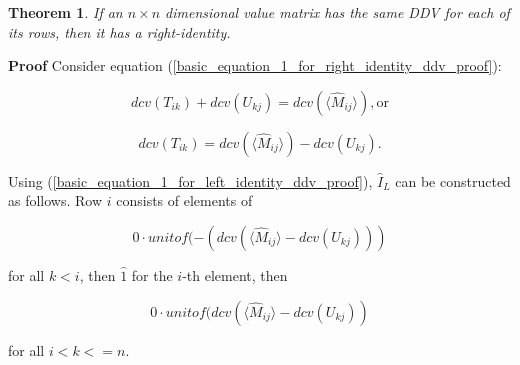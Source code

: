 \documentclass[10pt,letterpaper]{article}
\newtheorem{thm}{Theorem}[section]
\newenvironment{proof}{\noindent\textbf{Proof} }{\qed \newline}
\newcommand{\qed}{\nobreak \ifvmode \relax \else
      \ifdim\lastskip<1.5em \hskip-\lastskip
      \hskip1.5em plus0em minus0.5em \fi \nobreak
      \vrule height0.75em width0.5em depth0.25em\fi}
\numberwithin{equation}{section}
\begin{document}
\begin{thm}If an $n \times n$ dimensional value matrix has the same DDV for each of its rows, then it has a right-identity.\end{thm}

\begin{proof} Consider equation (\ref{basic_equation_1_for_right_identity_ddv_proof}):

\[ dcv(T_{ik}) + dcv(U_{kj}) = dcv( \langle \hat M_{ij} \rangle ) , \mbox{or} \]

\begin{equation} dcv(T_{ik}) = dcv( \langle \hat M_{ij} \rangle ) - dcv(U_{kj}) . \end{equation}

Using (\ref{basic_equation_1_for_left_identity_ddv_proof}), $\hat I_L$ can be constructed as follows.  Row $i$ consists of elements of 

\[ 0 \cdot unitof( -(dcv( \langle \hat M_{ij} \rangle - dcv(U_{kj}))) \]

for all $k < i$, then $\hat 1$ for the $i$-th element, then

\[ 0 \cdot unitof( dcv( \langle \hat M_{ij} \rangle - dcv(U_{kj})) \]

for all $i < k <= n$. \end{proof}
\end{document}
